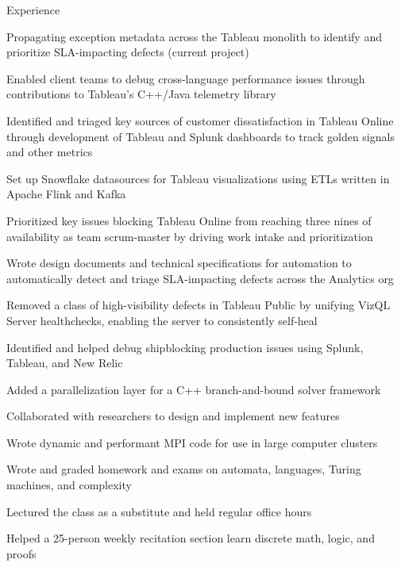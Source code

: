 \documentclass{cv}
\begin{document}

\begin{cvsection}{Experience}
  {
    \item Propagating exception metadata across the Tableau monolith to identify and prioritize SLA-impacting defects (current project)
    \item Enabled client teams to debug cross-language performance issues through contributions to Tableau's C++/Java telemetry library
    \item Identified and triaged key sources of customer dissatisfaction in Tableau Online through development of Tableau and Splunk dashboards to track golden signals and other metrics
    \item Set up Snowflake datasources for Tableau visualizations using ETLs written in Apache Flink and Kafka
    \item Prioritized key issues blocking Tableau Online from reaching three nines of availability as team scrum-master by driving work intake and prioritization
    \item Wrote design documents and technical specifications for automation to automatically detect and triage SLA-impacting defects across the Analytics org
    \item Removed a class of high-visibility defects in Tableau Public by unifying VizQL Server healthchecks, enabling the server to consistently self-heal
    \item Identified and helped debug shipblocking production issues using Splunk, Tableau, and New Relic
  }
  {
    \item Added a parallelization layer for a C++ branch-and-bound solver framework
    \item Collaborated with researchers to design and implement new features
    \item Wrote dynamic and performant MPI code for use in large computer clusters
  }
  {
    \item Wrote and graded homework and exams on automata, languages, Turing machines, and complexity
    \item Lectured the class as a substitute and held regular office hours
  }
  {
    \item Helped a 25-person weekly recitation section learn discrete math, logic, and proofs
  }
\end{cvsection}
\end{document}
